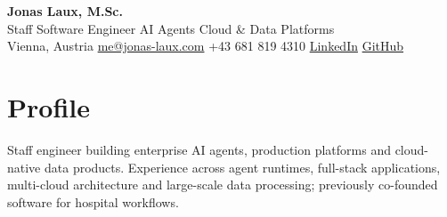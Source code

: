 \documentclass[11pt,a4paper]{article}
\begin{document}
\begin{center}
{\LARGE\bfseries Jonas Laux, M.Sc.}\\[-1pt]
Staff Software Engineer \textbar{} AI Agents \textbar{} Cloud \& Data Platforms\\[1pt]
Vienna, Austria \textbar{} \href{mailto:me@jonas-laux.com}{me@jonas-laux.com} \textbar{} +43 681 819 4310 \textbar{} \href{https://www.linkedin.com/in/jonas-laux}{LinkedIn} \textbar{} \href{https://github.com/JonasLaux}{GitHub}
\end{center}
\vspace{-8pt}
\section*{Profile}
Staff engineer building enterprise AI agents, production platforms and cloud-native data products. Experience across agent runtimes, full-stack applications, multi-cloud architecture and large-scale data processing; previously co-founded software for hospital workflows.
\end{document}

